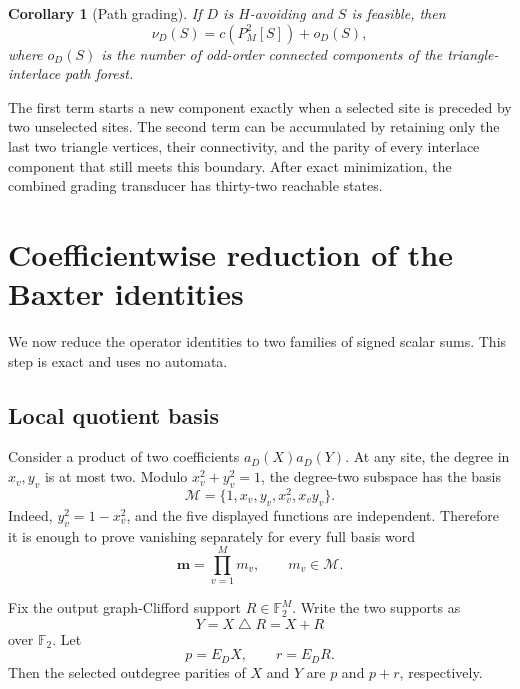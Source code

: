 \documentclass[10pt,letterpaper]{article}
\newtheorem{corollary}[theorem]{Corollary}
\newcommand{\FF}{\mathbb F_2}
\begin{document}
\begin{corollary}[Path grading]\label{cor:path-grading}
If \(D\) is \(H\)-avoiding and \(S\) is feasible, then
\begin{equation}\label{eq:path-grade}
 \boxed{\displaystyle
 \nu_D(S)=c(P_M^2[S])+o_D(S),}
\end{equation}
where \(o_D(S)\) is the number of odd-order connected components of the triangle-interlace path forest.
\end{corollary}

The first term starts a new component exactly when a selected site is preceded by two unselected sites.  The second term can be accumulated by retaining only the last two triangle vertices, their connectivity, and the parity of every interlace component that still meets this boundary.  After exact minimization, the combined grading transducer has thirty-two reachable states.

\section{Coefficientwise reduction of the Baxter identities}\label{sec:coefficients}

We now reduce the operator identities to two families of signed scalar sums.  This step is exact and uses no automata.

\subsection{Local quotient basis}

Consider a product of two coefficients \(a_D(X)a_D(Y)\).  At any site, the degree in \(x_v,y_v\) is at most two.  Modulo \(x_v^2+y_v^2=1\), the degree-two subspace has the basis
\begin{equation}\label{eq:local-basis}
 \mathcal M=\{1,x_v,y_v,x_v^2,x_vy_v\}.
\end{equation}
Indeed, \(y_v^2=1-x_v^2\), and the five displayed functions are independent.  Therefore it is enough to prove vanishing separately for every full basis word
\begin{equation}\label{eq:basis-word}
 \bm m=\prod_{v=1}^M m_v,
 \qquad m_v\in\mathcal M.
\end{equation}

Fix the output graph-Clifford support \(R\in\FF^M\).  Write the two supports as
\begin{equation}\label{eq:X-Y-R}
 Y=X\mathbin\triangle R=X+R
\end{equation}
over \(\FF\).  Let
\begin{equation}\label{eq:p-r}
 p=E_DX,
 \qquad r=E_DR.
\end{equation}
Then the selected outdegree parities of \(X\) and \(Y\) are \(p\) and \(p+r\), respectively.
\end{document}

